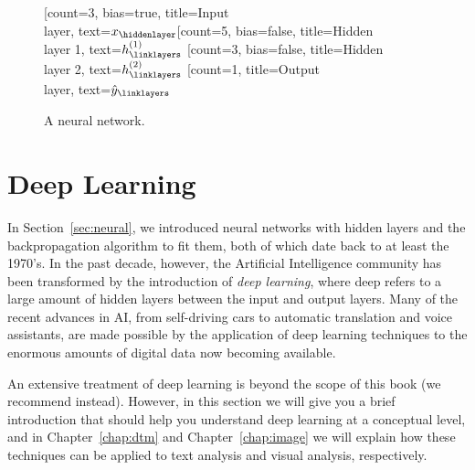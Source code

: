 \begin{figure}
  \centering
 \begin{neuralnetwork}[height=5]
        \newcommand{\x}[2]{$x_#2$}
        \newcommand{\y}[2]{$\hat{y}_#2$}
        \newcommand{\hfirst}[2]{\small $h^{(1)}_#2$}
        \newcommand{\hsecond}[2]{\small $h^{(2)}_#2$}
        [count=3, bias=true, title=Input\\layer, text=\x]
        \hiddenlayer[count=5, bias=false, title=Hidden\\layer 1, text=\hfirst] \linklayers
        \hiddenlayer[count=3, bias=false, title=Hidden\\layer 2, text=\hsecond] \linklayers
        \outputlayer[count=1, title=Output\\layer, text=\y] \linklayers
 \end{neuralnetwork}
\caption{A neural network. \label{fig:hiddenlayers}}
\end{figure}




%

\section{Deep Learning}
\label{sec:deeplearning}

In Section~\ref{sec:neural}, we introduced neural networks with hidden layers and the backpropagation algorithm to fit them,
both of which date back to at least the 1970's.
In the past decade, however, the Artificial Intelligence community has been transformed by the introduction of  
\emph{deep learning},
where deep refers to a large amount of hidden layers between the input and output layers.
Many of the recent advances in AI, from self-driving cars to automatic translation and voice assistants,
are made possible by the application of deep learning techniques to the enormous amounts of digital data now becoming available.

An extensive treatment of deep learning is beyond the scope of this book (we recommend \cite{geron2019hands} instead).
However, in this section we will give you a brief introduction that should help you understand deep learning at a conceptual level,
and in Chapter~\ref{chap:dtm} and Chapter~\ref{chap:image} we will explain how these techniques can be applied to text analysis and visual analysis, respectively.

